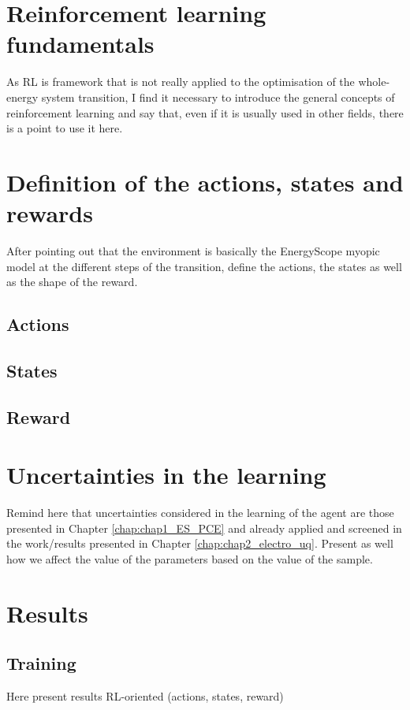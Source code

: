 
\section{Reinforcement learning fundamentals}
\label{sec:RL_fundamentals}
As RL is framework that is not really applied to the optimisation of the whole-energy system transition, I find it necessary to introduce the general concepts of reinforcement learning and say that, even if it is usually used in other fields, there is a point to use it here.

\section{Definition of the actions, states and rewards}
\label{sec:act_states_rew}
After pointing out that the environment is basically the EnergyScope myopic model at the different steps of the transition, define the actions, the states as well as the shape of the reward.

\subsection{Actions}
\subsection{States}
\subsection{Reward}

\section{Uncertainties in the learning}
Remind here that uncertainties considered in the learning of the agent are those presented in Chapter \ref{chap:chap1_ES_PCE} and already applied and screened in the work/results presented in Chapter \ref{chap:chap2_electro_uq}. Present as well how we affect the value of the parameters based on the value of the sample.

\section{Results}

\subsection{Training}
Here present results RL-oriented (actions, states, reward)

